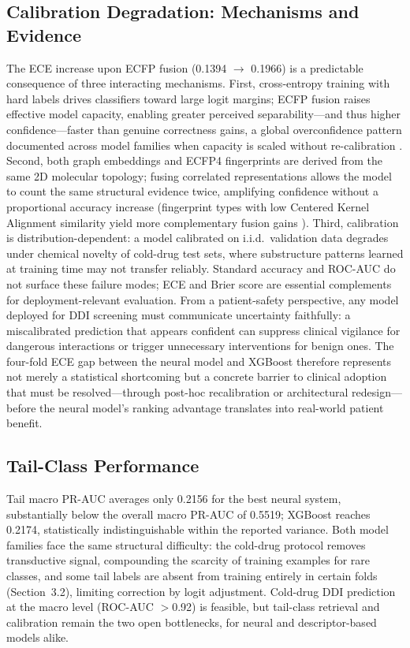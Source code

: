 \documentclass[11pt,a4paper,twocolumn]{article}
\begin{document}
\subsection{Calibration Degradation: Mechanisms and Evidence}
\label{sec:calib_mech}
The ECE increase upon ECFP fusion (0.1394 $\to$ 0.1966) is a predictable consequence
of three interacting mechanisms.
First, cross-entropy training with hard labels drives classifiers toward large logit
margins; ECFP fusion raises effective model capacity, enabling greater perceived
separability---and thus higher confidence---faster than genuine correctness gains,
a global overconfidence pattern documented across model families when capacity is
scaled without re-calibration \cite{friesacher2025calibration}.
Second, both graph embeddings and ECFP4 fingerprints are derived from the same 2D
molecular topology; fusing correlated representations allows the model to count the
same structural evidence twice, amplifying confidence without a proportional accuracy
increase (fingerprint types with low Centered Kernel Alignment similarity yield more
complementary fusion gains \cite{zagidullin2021fingerprints}).
Third, calibration is distribution-dependent: a model calibrated on i.i.d.\ validation
data degrades under chemical novelty of cold-drug test sets, where substructure
patterns learned at training time may not transfer reliably.
Standard accuracy and ROC-AUC do not surface these failure modes; ECE and Brier
score are essential complements for deployment-relevant evaluation.
From a patient-safety perspective, any model deployed for DDI screening must
communicate uncertainty faithfully: a miscalibrated prediction that appears
confident can suppress clinical vigilance for dangerous interactions or
trigger unnecessary interventions for benign ones.
The four-fold ECE gap between the neural model and XGBoost therefore
represents not merely a statistical shortcoming but a concrete barrier to
clinical adoption that must be resolved---through post-hoc recalibration or
architectural redesign---before the neural model's ranking advantage
translates into real-world patient benefit.

\subsection{Tail-Class Performance}
Tail macro PR-AUC averages only 0.2156 for the best neural system, substantially
below the overall macro PR-AUC of 0.5519; XGBoost reaches 0.2174, statistically
indistinguishable within the reported variance.
Both model families face the same structural difficulty: the cold-drug protocol
removes transductive signal, compounding the scarcity of training examples for
rare classes, and some tail labels are absent from training entirely in certain
folds (Section~3.2), limiting correction by logit adjustment.
Cold-drug DDI prediction at the macro level (ROC-AUC $>$0.92) is feasible, but
tail-class retrieval and calibration remain the two open bottlenecks, for neural
and descriptor-based models alike.
\end{document}

